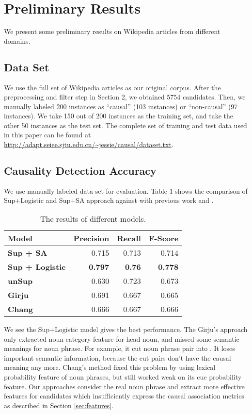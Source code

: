 \section{Preliminary Results}
\label{sec:eval}
We present some preliminary results on Wikipedia articles from different domains.

\subsection{Data Set}

We use the full set of Wikipedia articles as our original corpus. After the preprocessing and filter step in Section 2, we obtained 5754 candidates. Then, we manually labeled 200 instances as ``causal'' (103 instances) or ``non-causal'' (97 instances). We take 150 out of 200 instances as the training set, and take the other 50 instances as the test set. The complete set of training and test
data used in this paper can be found at \url{http://adapt.seiee.sjtu.edu.cn/~jessie/causal/dataset.txt}.

\subsection{Causality Detection Accuracy}

We use manually labeled data set for evaluation. Table 1 shows the comparison of Sup+Logistic and Sup+SA approach against with previous work \cite{girju2003automatic} and \cite{chang2006incremental}.


\begin{table}
\small
\begin{center}
\begin{tabular}{|l|r|r|r|}
\hline \bf Model & \bf Precision & \bf Recall & \bf F-Score \\ \hline

\bf Sup + SA & 0.715 & 0.713 & 0.714\\
\bf Sup + Logistic & {\bf 0.797} & {\bf 0.76} & {\bf 0.778} \\
\bf unSup & 0.630 & 0.723 & 0.673 \\
\bf Girju & 0.691 & 0.667 & 0.665 \\
\bf Chang & 0.666 & 0.667 & 0.666 \\
\hline
\end{tabular}
\end{center}
\caption{\label{table:accuracy} The results of different models. }
\end{table}

We see the Sup+Logistic model gives the best performance. The Girju's approach only extracted noun category feature for head noun, and missed some semantic meanings for noun phrase. For example, it cut noun phrase pair 
into . It loses important semantic information, because the cut pairs don't have the causal meaning any more. Chang's method fixed this problem by using lexical probability feature of noun phrases, but still worked weak on its cue probability feature. Our approaches consider the real noun phrase and extract more effective features for candidates which insufficiently express the causal association metrics as described in Section \ref{sec:features}.

